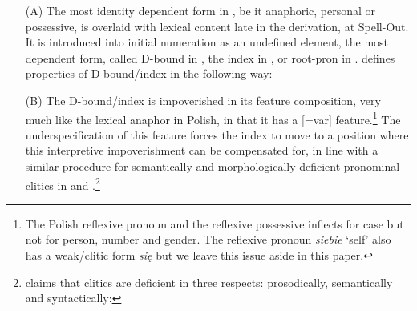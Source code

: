 \documentclass[output=paper,modfonts,nonflat
]{langsci/langscibook}
\begin{document}
\begin{itemize}
    \item[(A)] The most identity dependent form in , be it anaphoric, personal or possessive, is overlaid with lexical content late in the derivation, at Spell-Out. It is introduced into initial numeration as an undefined element, the most dependent form, called D-bound in \cite{safir2014}, the index in \cite{nikolaeva2014}, or root-pron in \cite{heinat2008}. \cite[91--92]{safir2014} defines properties of D-bound/index in the following way:
    \ea \label{ex:witkos:5}
    \z
    \z
    \item[(B)] The D-bound/index is impoverished in its feature composition, very much like the lexical anaphor in Polish, in that it has a [$-$var] feature.\footnote{\label{fn4}The Polish reflexive pronoun and the reflexive possessive inflects for case but not for person, number and gender. The reflexive pronoun \textit{siebie} ‘self’ also has a weak/clitic form \textit{się} but we leave this issue aside in this paper.} The underspecification of this feature forces the index to move to a position where this interpretive impoverishment can be compensated for, in line with a similar procedure for semantically and morphologically deficient pronominal clitics in \cite{bejar2003} and \cite{franks2017,franks2018}.\footnote{\label{fn6}\cite{franks2017,franks2018} claims that clitics are deficient in three respects: prosodically, semantically and syntactically:

}
\end{itemize}
\end{document}
